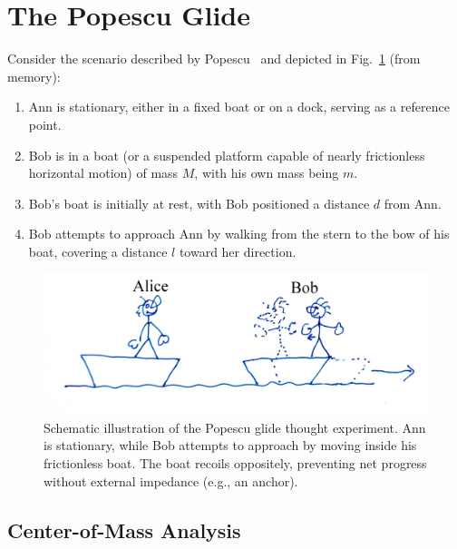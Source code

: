 \documentclass[reprint,aps,pra,superscriptaddress,longbibliography]{revtex4-2}
\begin{document}
\section{The Popescu Glide}

Consider the scenario described by Popescu~\cite{popescu_talk_2024} and depicted in Fig.~\ref{fig:popescu-glide} (from memory):

\begin{enumerate}
    \item Ann is stationary, either in a fixed boat or on a dock, serving as a reference point.
    \item Bob is in a boat (or a suspended platform capable of nearly frictionless horizontal motion) of mass $M$, with his own mass being $m$.
    \item Bob's boat is initially at rest, with Bob positioned a distance $d$ from Ann.
    \item Bob attempts to approach Ann by walking from the stern to the bow of his boat, covering a distance $l$ toward her direction.
\end{enumerate}

\begin{figure}[htbp]
    \centering
    \includegraphics[width=0.8\columnwidth]{2025-wind-f-AliceBobPopescu.jpg}
    \caption{Schematic illustration of the Popescu glide thought experiment. Ann is stationary, while Bob attempts to approach by moving inside his frictionless boat. The boat recoils oppositely, preventing net progress without external impedance (e.g., an anchor).}
    \label{fig:popescu-glide}
\end{figure}

\subsection{Center-of-Mass Analysis}
\end{document}
